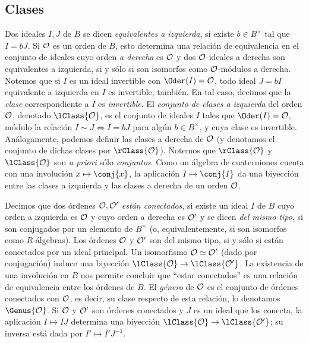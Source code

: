 \subsection{Clases}
Dos ideales $I,J$ de $B$ se dicen \emph{equivalentes a izquierda}, si
existe $b\in B^{\times}$ tal que $I=bJ$.
Si $\cal{O}$ es un orden de $B$, esto determina una relaci\'{o}n de
equivalencia en el conjunto de ideales cuyo orden \emph{a derecha} es
$\cal{O}$ y dos $\cal{O}$-ideales a derecha son equivalentes a izquierda,
si y s\'{o}lo si son isomorfos como $\cal{O}$-m\'{o}dulos a derecha.
Notemos que si $I$ es un ideal invertible con $\Oder(I)=\cal{O}$, todo
ideal $J=bI$ equivalente a izquierda cn $I$ es invertible, tambi\'{e}n.
En tal caso, decimos que la \emph{clase} correspondiente a $I$ es
\emph{invertible}. El \emph{conjunto de clases a izquierda} del orden
$\cal{O}$, denotado $\lClass{\cal{O}}$, es el conjunto de ideales
$I$ tales que $\Oder(I)=\cal{O}$, m\'{o}dulo la relaci\'{o}n
$I\sim J\Leftrightarrow I=bJ$ para alg\'{u}n $b\in B^{\times}$, y cuya clase
es invertible. An\'{a}logamente, podemos definir las clases a derecha de
$\cal{O}$ (y denotamos el conjunto de dichas clases por $\rClass{\cal{O}}$).
Notemos que $\rClass{\cal{O}}$ y $\lClass{\cal{O}}$ son \emph{a priori}
s\'{o}lo \emph{conjuntos}.
Como un \'{a}lgebra de cuaterniones cuenta con una involuci\'{o}n
$x\mapsto\conj{x}$, la aplicaci\'{o}n $I\mapsto\conj{I}$ da una biyecci\'{o}n
entre las clases a izquierda y las clases a derecha de un orden $\cal{O}$.

Decimos que dos \'{o}rdenes $\cal{O},\cal{O}'$ \emph{est\'{a}n conectados},
si existe un ideal $I$ de $B$ cuyo orden a izquierda es $\cal{O}$ y cuyo
orden a derecha es $\cal{O}'$ y se dicen \emph{del mismo tipo}, si son
conjugados por un elemento de $B^{\times}$ (o, equivalentemente, si son
isomorfos como $R$-\'{a}lgebras). Los \'{o}rdenes $\cal{O}$ y $\cal{O}'$ son
del mismo tipo, si y s\'{o}lo si est\'{a}n conectados por un ideal principal.
Un isomorfismo $\cal{O}\simeq\cal{O}'$ (dado por conjugaci\'{o}n) induce una
biyecci\'{o}n $\lClass{\cal{O}}\rightarrow\lClass{\cal{O}'}$.
La existencia de una involuci\'{o}n en $B$ nos permite concluir
que ``estar conectados'' es una relaci\'{o}n de equivalencia entre los
\'{o}rdenes de $B$. El \emph{g\'{e}nero} de $\cal{O}$ es el conjunto de
\'{o}rdenes conectados con $\cal{O}$, es decir, su clase respecto de
esta relaci\'{o}n, lo denotamos $\Genus{\cal{O}}$.
Si $\cal{O}$ y $\cal{O}'$ son \'{o}rdenes conectados
y $J$ es un ideal que los conecta, la aplicaci\'{o}n $I\mapsto IJ$ determina
una biyecci\'{o}n $\lClass{\cal{O}}\rightarrow\lClass{\cal{O}'}$;
su inversa est\'{a} dada por $I'\mapsto I'J^{-1}$.

